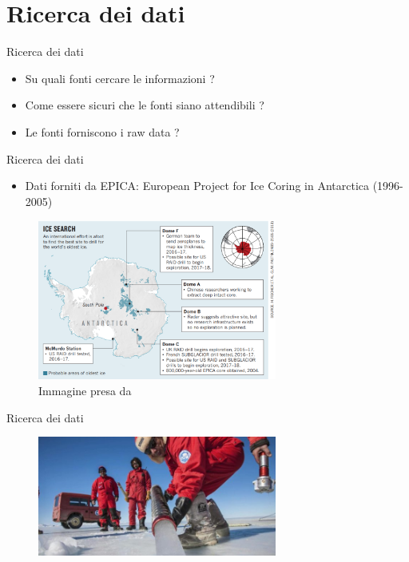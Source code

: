 \documentclass{beamer}
\begin{document}
\section{Ricerca dei dati}

\begin{frame}{Ricerca dei dati}
\begin{itemize}
\item Su quali fonti cercare le informazioni ? 
\item Come essere sicuri che le fonti siano attendibili ? 
\item Le fonti forniscono i raw data ? 
\end{itemize}
\end{frame}

\begin{frame}{Ricerca dei dati}
\begin{itemize}
\item Dati forniti da EPICA: European Project for Ice Coring in Antarctica (1996-2005)
\end{itemize}
\begin{figure}
\begin{center}
\includegraphics[width=0.7\textwidth ]{Pic/EPICAC.png}
\caption{Immagine presa da \cite{EPICAC}}
\end{center}
\end{figure}

\end{frame}


\begin{frame}{Ricerca dei dati}
\begin{figure}
\begin{center}
\includegraphics[width=0.7\textwidth ]{Pic/Carotaggi.jpg}
\end{center}
\end{figure}

\end{frame}
\end{document}
